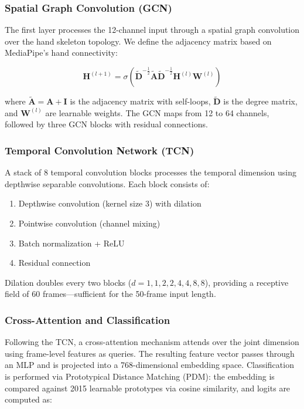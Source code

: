 \documentclass[conference]{IEEEtran}
\begin{document}
\subsubsection{Spatial Graph Convolution (GCN)}
The first layer processes the 12-channel input through a spatial graph convolution over the hand skeleton topology. We define the adjacency matrix based on MediaPipe's hand connectivity:

\begin{equation}
\mathbf{H}^{(l+1)} = \sigma\left(\tilde{\mathbf{D}}^{-\frac{1}{2}} \tilde{\mathbf{A}} \tilde{\mathbf{D}}^{-\frac{1}{2}} \mathbf{H}^{(l)} \mathbf{W}^{(l)}\right)
\end{equation}

where $\tilde{\mathbf{A}} = \mathbf{A} + \mathbf{I}$ is the adjacency matrix with self-loops, $\tilde{\mathbf{D}}$ is the degree matrix, and $\mathbf{W}^{(l)}$ are learnable weights. The GCN maps from 12 to 64 channels, followed by three GCN blocks with residual connections.

\subsubsection{Temporal Convolution Network (TCN)}
A stack of 8 temporal convolution blocks processes the temporal dimension using depthwise separable convolutions. Each block consists of:
\begin{enumerate}
    \item Depthwise convolution (kernel size 3) with dilation
    \item Pointwise convolution (channel mixing)
    \item Batch normalization + ReLU
    \item Residual connection
\end{enumerate}
Dilation doubles every two blocks ($d = 1, 1, 2, 2, 4, 4, 8, 8$), providing a receptive field of 60 frames---sufficient for the 50-frame input length.

\subsubsection{Cross-Attention and Classification}
Following the TCN, a cross-attention mechanism attends over the joint dimension using frame-level features as queries. The resulting feature vector passes through an MLP and is projected into a 768-dimensional embedding space. Classification is performed via Prototypical Distance Matching (PDM): the embedding is compared against 2015 learnable prototypes via cosine similarity, and logits are computed as:
\end{document}
